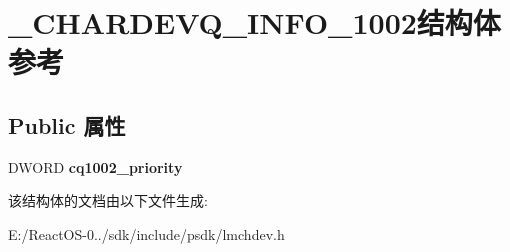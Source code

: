 \hypertarget{struct___c_h_a_r_d_e_v_q___i_n_f_o__1002}{}\section{\+\_\+\+C\+H\+A\+R\+D\+E\+V\+Q\+\_\+\+I\+N\+F\+O\+\_\+1002结构体 参考}
\label{struct___c_h_a_r_d_e_v_q___i_n_f_o__1002}
\subsection*{Public 属性}
\begin{DoxyCompactItemize}
\item 
\mbox{\label{struct___c_h_a_r_d_e_v_q___i_n_f_o__1002_a0ad0a2801a47bffbae543dedfb1a9de9}} 
D\+W\+O\+RD {\bfseries cq1002\+\_\+priority}
\end{DoxyCompactItemize}


该结构体的文档由以下文件生成\+:\begin{DoxyCompactItemize}
\item 
E\+:/\+React\+O\+S-\/0../sdk/include/psdk/lmchdev.\+h\end{DoxyCompactItemize}
